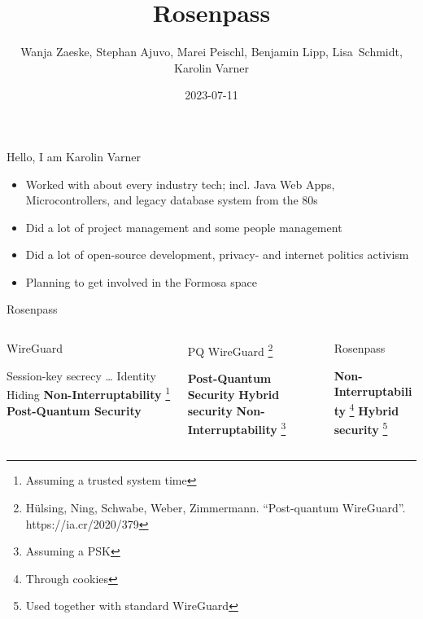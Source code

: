 \documentclass{rosenpass-beamer}
\title{Rosenpass}
\author{
Wanja Zaeske, Stephan Ajuvo, Marei Peischl, Benjamin Lipp, Lisa~Schmidt, Karolin Varner
}
\institute{\url{https://rosenpass.eu}}
\date{2023-07-11}
\newcommand*{\heading}[1]{
  {
    \hspace*{-0.5cm}#1
    \vspace{1.0em}
  }
}
\begin{document}
\maketitle

\begin{frame}{Hello, I am Karolin Varner}
\begin{itemize}
  \item Worked with about every industry tech; incl. Java Web Apps, Microcontrollers, and legacy database system from the 80s
  \item Did a lot of project management and some people management
  \item Did a lot of open-source development, privacy- and internet politics activism
  \item Planning to get involved in the Formosa space
\end{itemize}
\end{frame}

\begin{frame}{Rosenpass}

\vspace{0.5em}
\begin{columns}[t]
\begin{column}{.30\textwidth}
\heading{WireGuard}
\begin{itemize}
  \itemtick Session-key secrecy
  \itemtick \dots
  \itemtick Identity Hiding
  \itemfail \textbf{Non-Interruptability} \footnote[frame]{Assuming a trusted system time}
  \itemfail \textbf{Post-Quantum Security}
\end{itemize}
\end{column}

\begin{column}{.30\textwidth}
\heading{
  PQ WireGuard
  \footnote[frame]{
	  Hülsing, Ning, Schwabe, Weber, Zimmermann. “Post-quantum WireGuard”. https://ia.cr/2020/379
	}
}
\begin{itemize}
  \itemtick \textbf{Post-Quantum Security}
  \itemfail \textbf{Hybrid security}
  \itemfail \textbf{Non-Interruptability} \footnote[frame]{Assuming a PSK}
\end{itemize}
\end{column}

\begin{column}{.30\textwidth}
\heading{Rosenpass}
\begin{itemize}
  \itemtick \textbf{Non-Interruptability} \footnote[frame]{Through cookies}
  \itemtick \textbf{Hybrid security} \footnote[frame]{Used together with standard WireGuard}
\end{itemize}
\end{column}

\end{columns}
\vspace{1.5em}

\end{frame}
\end{document}
